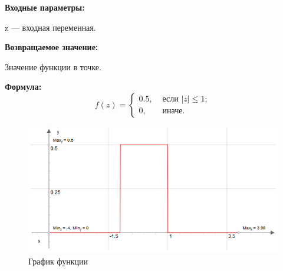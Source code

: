 \textbf{Входные параметры:}
 
z --- входная переменная.

\textbf{Возвращаемое значение:}
 
Значение функции в точке.

\textbf{Формула:}
\begin{equation*}
f\left(z \right)=\left\lbrace \begin{aligned} 0.5,& \text{ если } \left|z\right| \leq 1 ; \\ 0,& \text{ иначе}. \end{aligned}\right.
\end{equation*}

 \begin{figure} [h] 
   \center
   \includegraphics {MHL_BellShapedKernelRectangle_Graph.png}
   \caption{График функции} 
   \label{img:MHL_BellShapedKernelRectangle_Graph}  
 \end{figure}
